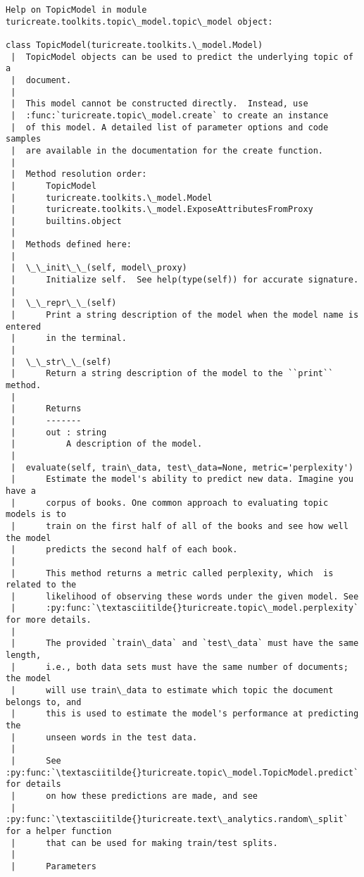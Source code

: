 \documentclass[11pt]{ctexart}
\begin{document}
    \begin{Verbatim}[commandchars=\\\{\}]
Help on TopicModel in module turicreate.toolkits.topic\_model.topic\_model object:

class TopicModel(turicreate.toolkits.\_model.Model)
 |  TopicModel objects can be used to predict the underlying topic of a
 |  document.
 |  
 |  This model cannot be constructed directly.  Instead, use
 |  :func:`turicreate.topic\_model.create` to create an instance
 |  of this model. A detailed list of parameter options and code samples
 |  are available in the documentation for the create function.
 |  
 |  Method resolution order:
 |      TopicModel
 |      turicreate.toolkits.\_model.Model
 |      turicreate.toolkits.\_model.ExposeAttributesFromProxy
 |      builtins.object
 |  
 |  Methods defined here:
 |  
 |  \_\_init\_\_(self, model\_proxy)
 |      Initialize self.  See help(type(self)) for accurate signature.
 |  
 |  \_\_repr\_\_(self)
 |      Print a string description of the model when the model name is entered
 |      in the terminal.
 |  
 |  \_\_str\_\_(self)
 |      Return a string description of the model to the ``print`` method.
 |      
 |      Returns
 |      -------
 |      out : string
 |          A description of the model.
 |  
 |  evaluate(self, train\_data, test\_data=None, metric='perplexity')
 |      Estimate the model's ability to predict new data. Imagine you have a
 |      corpus of books. One common approach to evaluating topic models is to
 |      train on the first half of all of the books and see how well the model
 |      predicts the second half of each book.
 |      
 |      This method returns a metric called perplexity, which  is related to the
 |      likelihood of observing these words under the given model. See
 |      :py:func:`\textasciitilde{}turicreate.topic\_model.perplexity` for more details.
 |      
 |      The provided `train\_data` and `test\_data` must have the same length,
 |      i.e., both data sets must have the same number of documents; the model
 |      will use train\_data to estimate which topic the document belongs to, and
 |      this is used to estimate the model's performance at predicting the
 |      unseen words in the test data.
 |      
 |      See :py:func:`\textasciitilde{}turicreate.topic\_model.TopicModel.predict` for details
 |      on how these predictions are made, and see
 |      :py:func:`\textasciitilde{}turicreate.text\_analytics.random\_split` for a helper function
 |      that can be used for making train/test splits.
 |      
 |      Parameters

\end{Verbatim}
\end{document}
